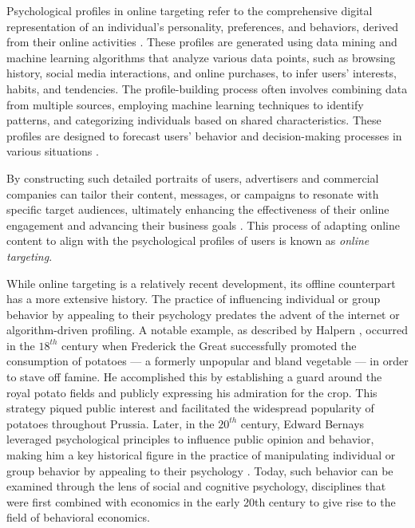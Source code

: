 \documentclass[preprint]{acmart}
\begin{document}
Psychological profiles in online targeting refer to the comprehensive digital representation of an individual's personality, preferences, and behaviors, derived from their online activities \cite{boerman2017online}. These profiles are generated using data mining and machine learning algorithms that analyze various data points, such as browsing history, social media interactions, and online purchases, to infer users' interests, habits, and tendencies. The profile-building process often involves combining data from multiple sources, employing machine learning techniques to identify patterns, and categorizing individuals based on shared characteristics. These profiles are designed to forecast users' behavior and decision-making processes in various situations \cite{Koene2015}. 


By constructing such detailed portraits of users, advertisers and commercial companies can tailor their content, messages, or campaigns to resonate with specific target audiences, ultimately enhancing the effectiveness of their online engagement \cite{Beer2019} and advancing their business goals \cite{Susserand2019,matz2017psychological}. This process of adapting online content to align with the psychological profiles of users is known as \textit{online targeting}. 


While online targeting is a relatively recent development, its offline counterpart has a more extensive history. The practice of influencing individual or group behavior by appealing to their psychology predates the advent of the internet or algorithm-driven profiling. A notable example, as described by Halpern \cite{halpern2015}, occurred in the $18^{th}$ century when Frederick the Great successfully promoted the consumption of potatoes --- a formerly unpopular and bland vegetable --- in order to stave off famine. He accomplished this by establishing a guard around the royal potato fields and publicly expressing his admiration for the crop. This strategy piqued public interest and facilitated the widespread popularity of potatoes throughout Prussia. Later, in the $20^{th}$ century, Edward Bernays leveraged psychological principles to influence public opinion and behavior, making him a key historical figure in the practice of manipulating individual or group behavior by appealing to their psychology \cite{bernays1947engineering,bernays1928manipulating}. Today, such behavior can be examined through the lens of social and cognitive psychology, disciplines that were first combined with economics in the early 20th century to give rise to the field of behavioral economics.
\end{document}
